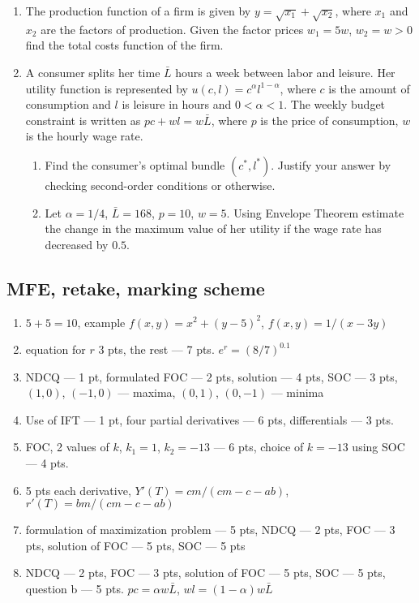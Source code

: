 \begin{enumerate}[resume]
\item The production function of a firm is given by $y=\sqrt{x_1}+\sqrt{x_2}$, where $x_1$ and $x_2$ are the factors of production. Given the factor prices $w_1=5w$, $w_2=w>0$ find the total costs function of the firm.
\item A consumer splits her time $\bar{L}$ hours a week between labor and leisure. Her utility function is represented by $u(c,l)=c^{\alpha}l^{1-\alpha}$, where $c$ is the amount of consumption and $l$ is leisure in hours and $0<\alpha<1$. The weekly budget constraint is written as $pc+wl=w\bar{L}$,
where $p$ is the price of consumption, $w$ is the hourly wage rate.
\begin{enumerate}
\item Find the consumer’s optimal bundle $(c^*,l^*)$. Justify your answer by checking second-order conditions or otherwise.
\item Let $\alpha=1/4$, $\bar{L}=168$, $p=10$, $w=5$. Using Envelope Theorem estimate the change in the maximum value of her utility if the wage rate has decreased by $0.5$.
\end{enumerate}

\end{enumerate}

\subsection{MFE, retake, marking scheme}

\begin{enumerate}
\item $5+5=10$, example $f(x,y)=x^2+(y-5)^2$, $f(x,y)=1/(x-3y)$
\item equation for $r$ 3 pts, the rest --- 7 pts. $e^r=(8/7)^{0.1}$
\item NDCQ --- 1 pt, formulated FOC --- 2 pts, solution --- 4 pts, SOC --- 3 pts, $(1,0)$, $(-1,0)$ --- maxima, $(0,1)$, $(0,-1)$ --- minima
\item Use of IFT --- 1 pt, four partial derivatives --- 6 pts, differentials --- 3 pts.
\item FOC, 2 values of $k$, $k_1=1$, $k_2=-13$ --- 6 pts, choice of $k=-13$ using SOC --- 4 pts.
\item 5 pts each derivative, $Y'(T)=cm/(cm-c-ab)$, $r'(T)=bm/(cm-c-ab)$
\item formulation of maximization problem --- 5 pts, NDCQ --- 2 pts, FOC --- 3 pts, solution of FOC --- 5 pts, SOC --- 5 pts
\item  NDCQ --- 2 pts, FOC --- 3 pts, solution of FOC --- 5 pts, SOC --- 5 pts, question b --- 5 pts. $pc=\alpha w\bar{L}$, $wl=(1-\alpha)w\bar{L}$
\end{enumerate}

